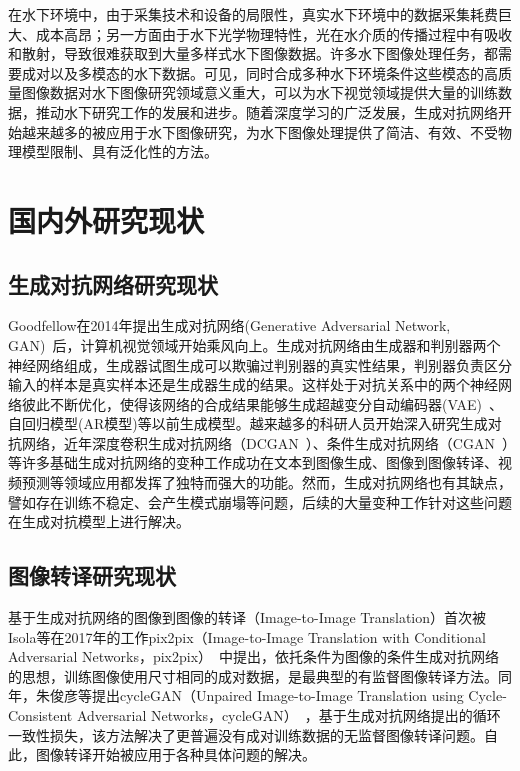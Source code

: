 在水下环境中，由于采集技术和设备的局限性，真实水下环境中的数据采集耗费巨大、成本高昂；另一方面由于水下光学物理特性，光在水介质的传播过程中有吸收和散射，导致很难获取到大量多样式水下图像数据。许多水下图像处理任务，都需要成对以及多模态的水下数据。可见，同时合成多种水下环境条件这些模态的高质量图像数据对水下图像研究领域意义重大，可以为水下视觉领域提供大量的训练数据，推动水下研究工作的发展和进步。随着深度学习的广泛发展，生成对抗网络开始越来越多的被应用于水下图像研究，为水下图像处理提供了简洁、有效、不受物理模型限制、具有泛化性的方法。


\section{国内外研究现状}
\subsection{生成对抗网络研究现状}
Goodfellow在2014年提出生成对抗网络(Generative Adversarial Network, GAN)~\cite{goodfellow2014generative}后，计算机视觉领域开始乘风向上。生成对抗网络由生成器和判别器两个神经网络组成，生成器试图生成可以欺骗过判别器的真实性结果，判别器负责区分输入的样本是真实样本还是生成器生成的结果。这样处于对抗关系中的两个神经网络彼此不断优化，使得该网络的合成结果能够生成超越变分自动编码器(VAE)~\cite{kingma2013auto}、自回归模型(AR模型)等以前生成模型。越来越多的科研人员开始深入研究生成对抗网络，近年深度卷积生成对抗网络（DCGAN~\cite{radford2015unsupervised}）、条件生成对抗网络（CGAN~\cite{mirza2014conditional}）等许多基础生成对抗网络的变种工作成功在文本到图像生成、图像到图像转译、视频预测等领域应用都发挥了独特而强大的功能。然而，生成对抗网络也有其缺点，譬如存在训练不稳定、会产生模式崩塌等问题，后续的大量变种工作针对这些问题在生成对抗模型上进行解决。


\subsection{图像转译研究现状}
基于生成对抗网络的图像到图像的转译（Image-to-Image Translation）首次被Isola等在2017年的工作pix2pix（Image-to-Image Translation with Conditional Adversarial Networks，pix2pix）~\cite{isola2017image}中提出，依托条件为图像的条件生成对抗网络的思想，训练图像使用尺寸相同的成对数据，是最典型的有监督图像转译方法。同年，朱俊彦等提出cycleGAN（Unpaired Image-to-Image Translation using Cycle-Consistent Adversarial Networks，cycleGAN）~\cite{zhu2017unpaired}，基于生成对抗网络提出的循环一致性损失，该方法解决了更普遍没有成对训练数据的无监督图像转译问题。自此，图像转译开始被应用于各种具体问题的解决。

